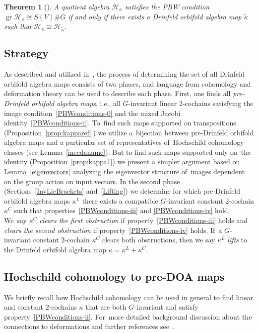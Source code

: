\documentclass[10pt,a4paper]{amsart}
\numberwithin{equation}{section}
\newtheorem{Theorem}{Theorem}[section]
\newcommand{\standout}[1]{\textit{#1}} %
\DeclareMathOperator{\gr}{gr}
\begin{document}
\begin{Theorem}[{\cite[Theorems~3.1 and~7.2(ii)]{SWorbifold}}]
	A quotient algebra $\mathcal{H}_{\kappa}$ satisfies the PBW condition
	$\gr\mathcal{H}_{\kappa}\cong S(V)\# G$ if and only if there exists a
	Drinfeld orbifold algebra map $\widetilde{\kappa}$ such that $\mathcal{H_{\kappa}}\cong\mathcal{H_{\widetilde{\kappa}}}$.
\end{Theorem}

\subsection{Strategy}
As described and utilized in~\cite{FGK}, the process of determining the set
of all Drinfeld orbifold algebra maps consists of two phases, and language
from cohomology and deformation theory can be used to describe each phase.
First, one finds all \standout{pre-Drinfeld orbifold algebra maps},
i.e., all $G$-invariant linear $2$-cochains satisfying the image
condition~\eqref{PBWconditions-0} and the mixed Jacobi identity~\eqref{PBWconditions-ii}.
To~find such maps supported on transpositions (Proposition~\ref{prop:kapparefl}) we utilize
a~bijec\-tion between pre-Drinfeld orbifold algebra maps and a particular
set of representatives of~Hochschild cohomology classes (see Lemma~\ref{ineedaname}).
But to find such maps supported only on~the identity (Proposition~\ref{prop:kappa1})
we present a simpler argument based on Lemma~\ref{eigenvectors}
analyzing the eigenvector structure of~images dependent on the group action
on input vectors.
In the second phase (Sections~\ref{InvLieBrackets} and~\ref{Lifting})
we determine for which
pre-Drinfeld orbifold algebra maps $\kappa^L$ there exists a compatible $G$-invariant
constant $2$-cochain $\kappa^C$ such that properties~\eqref{PBWconditions-iii}
and \eqref{PBWconditions-iv} hold. We~say $\kappa^C$
\standout{clears the first obstruction} if property~\eqref{PBWconditions-iii} holds
and \standout{clears the second obstruction} if property~\eqref{PBWconditions-iv} holds. If~a $G$-invariant constant $2$-cochain $\kappa^C$ clears both obstructions, then
we say $\kappa^L$ \standout{lifts} to the Drinfeld orbifold algebra map $\kappa=\kappa^L+\kappa^C$.

\subsection{Hochschild cohomology to pre-DOA maps}

We briefly recall how Hochschild cohomology can be used in general
to find linear and constant $2$-cochains $\kappa$ that are both $G$-invariant
and satisfy property~\eqref{PBWconditions-ii}. For~more detailed background discussion about the connections to deformations
and further references see~\cite{FGK}.
\end{document}
